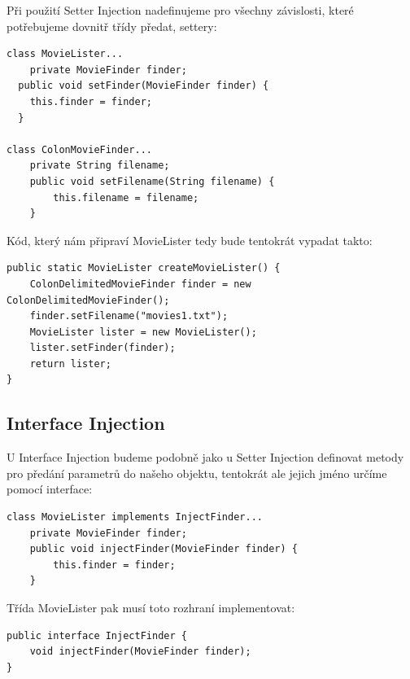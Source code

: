 \documentclass[a4paper,conference]{IEEEtran}
\begin{document}
Při použití Setter Injection nadefinujeme pro všechny závislosti, které potřebujeme dovnitř třídy předat, settery:

\lstset{language=Java, caption=MovieLister a Setter Injection, label=listing:Java}
\begin{lstlisting}
class MovieLister...
    private MovieFinder finder;
  public void setFinder(MovieFinder finder) {
    this.finder = finder;
  }

class ColonMovieFinder...
    private String filename;
    public void setFilename(String filename) {
        this.filename = filename;
    }
\end{lstlisting}

Kód, který nám připraví MovieLister tedy bude tentokrát vypadat takto:

\lstset{language=Java, caption=MovieLister Setter Injection a factory metoda, label=listing:Java}
\begin{lstlisting}
public static MovieLister createMovieLister() {
    ColonDelimitedMovieFinder finder = new ColonDelimitedMovieFinder();
    finder.setFilename("movies1.txt");
    MovieLister lister = new MovieLister();
    lister.setFinder(finder);
    return lister;
}
\end{lstlisting}

\subsection{Interface Injection}

U Interface Injection budeme podobně jako u Setter Injection definovat metody pro předání parametrů do našeho objektu, tentokrát ale jejich jméno určíme pomocí interface:

\lstset{language=Java,caption=Třída MovieLister implementující definované rozhraní,label=listing:Java}
\begin{lstlisting}
class MovieLister implements InjectFinder...
    private MovieFinder finder;
    public void injectFinder(MovieFinder finder) {
        this.finder = finder;
    }
\end{lstlisting}

Třída MovieLister pak musí toto rozhraní implementovat:

\lstset{language=Java,caption=Interface pro interface injection,label=listing:Java}
\begin{lstlisting}
public interface InjectFinder {
    void injectFinder(MovieFinder finder);
}
\end{lstlisting}
\end{document}
